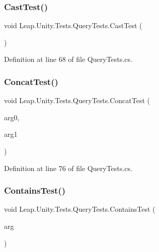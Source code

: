 \subsubsection{\texorpdfstring{CastTest()}{CastTest()}}
{\footnotesize\ttfamily void Leap.\+Unity.\+Tests.\+Query\+Tests.\+Cast\+Test (\begin{DoxyParamCaption}{ }\end{DoxyParamCaption})}



Definition at line 68 of file Query\+Tests.\+cs.

\mbox{\label{class_leap_1_1_unity_1_1_tests_1_1_query_tests_aba795b21c7c5b21ce0e665dd3e0a1e70}} 
\subsubsection{\texorpdfstring{ConcatTest()}{ConcatTest()}}
{\footnotesize\ttfamily void Leap.\+Unity.\+Tests.\+Query\+Tests.\+Concat\+Test (\begin{DoxyParamCaption}\item[{\mbox{[}\+Value\+Source(\char`\"{}list0\char`\"{})\mbox{]} \mbox{\hyperlink{class_leap_1_1_unity_1_1_tests_1_1_query_tests_1_1_query_arg}{Query\+Arg}}}]{arg0,  }\item[{\mbox{[}\+Value\+Source(\char`\"{}list0\char`\"{})\mbox{]} \mbox{\hyperlink{class_leap_1_1_unity_1_1_tests_1_1_query_tests_1_1_query_arg}{Query\+Arg}}}]{arg1 }\end{DoxyParamCaption})}



Definition at line 76 of file Query\+Tests.\+cs.

\mbox{\label{class_leap_1_1_unity_1_1_tests_1_1_query_tests_a4d763e6e0917742da84fce7bd5a9d008}} 
\subsubsection{\texorpdfstring{ContainsTest()}{ContainsTest()}}
{\footnotesize\ttfamily void Leap.\+Unity.\+Tests.\+Query\+Tests.\+Contains\+Test (\begin{DoxyParamCaption}\item[{\mbox{[}\+Value\+Source(\char`\"{}list0\char`\"{})\mbox{]} \mbox{\hyperlink{class_leap_1_1_unity_1_1_tests_1_1_query_tests_1_1_query_arg}{Query\+Arg}}}]{arg }\end{DoxyParamCaption})}



